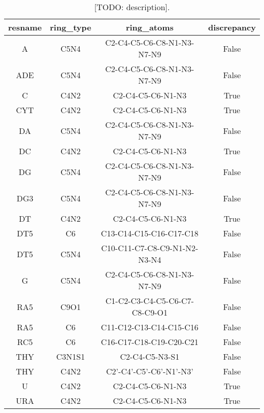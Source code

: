 \begin{table}[H]
  \caption{\label{tab:appx1/aromatic_nucleic} [TODO: description].}
  \centering
  \begin{tabular}{cccc}
    \hline
    resname & ring\_type & ring\_atoms                   & discrepancy \\ \hline
    A       & C5N4       & C2-C4-C5-C6-C8-N1-N3-N7-N9    & False       \\
    ADE     & C5N4       & C2-C4-C5-C6-C8-N1-N3-N7-N9    & False       \\
    C       & C4N2       & C2-C4-C5-C6-N1-N3             & True        \\
    CYT     & C4N2       & C2-C4-C5-C6-N1-N3             & True        \\
    DA      & C5N4       & C2-C4-C5-C6-C8-N1-N3-N7-N9    & False       \\
    DC      & C4N2       & C2-C4-C5-C6-N1-N3             & True        \\
    DG      & C5N4       & C2-C4-C5-C6-C8-N1-N3-N7-N9    & False       \\
    DG3     & C5N4       & C2-C4-C5-C6-C8-N1-N3-N7-N9    & False       \\
    DT      & C4N2       & C2-C4-C5-C6-N1-N3             & True        \\
    DT5     & C6         & C13-C14-C15-C16-C17-C18       & False       \\
    DT5     & C5N4       & C10-C11-C7-C8-C9-N1-N2-N3-N4  & False       \\
    G       & C5N4       & C2-C4-C5-C6-C8-N1-N3-N7-N9    & False       \\
    RA5     & C9O1       & C1-C2-C3-C4-C5-C6-C7-C8-C9-O1 & False       \\
    RA5     & C6         & C11-C12-C13-C14-C15-C16       & False       \\
    RC5     & C6         & C16-C17-C18-C19-C20-C21       & False       \\
    THY     & C3N1S1     & C2-C4-C5-N3-S1                & False       \\
    THY     & C4N2       & C2'-C4'-C5'-C6'-N1'-N3'       & False       \\
    U       & C4N2       & C2-C4-C5-C6-N1-N3             & True        \\
    URA     & C4N2       & C2-C4-C5-C6-N1-N3             & True        \\ \hline
  \end{tabular}
\end{table}

